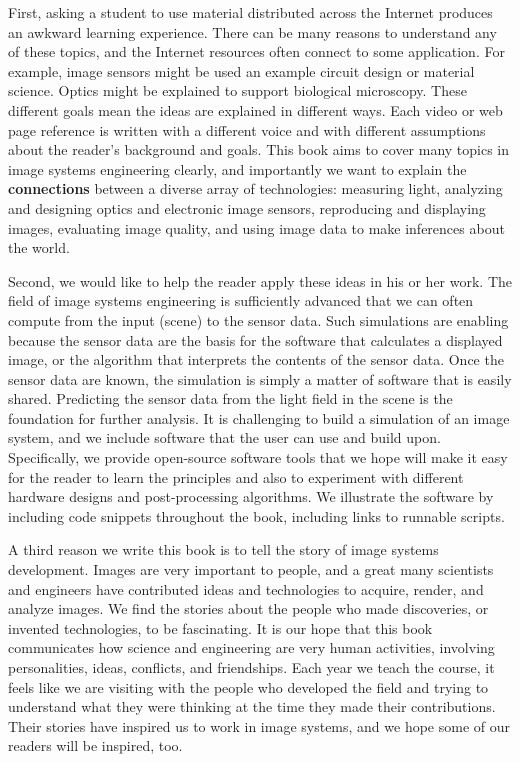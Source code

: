 \documentclass[
  letterpaper,
]{book}
\begin{document}
First, asking a student to use material distributed across the Internet
produces an awkward learning experience. There can be many reasons to
understand any of these topics, and the Internet resources often connect
to some application. For example, image sensors might be used an example
circuit design or material science. Optics might be explained to support
biological microscopy. These different goals mean the ideas are
explained in different ways. Each video or web page reference is written
with a different voice and with different assumptions about the reader's
background and goals. This book aims to cover many topics in image
systems engineering clearly, and importantly we want to explain the
\textbf{connections} between a diverse array of technologies: measuring
light, analyzing and designing optics and electronic image sensors,
reproducing and displaying images, evaluating image quality, and using
image data to make inferences about the world.

Second, we would like to help the reader apply these ideas in his or her
work. The field of image systems engineering is sufficiently advanced
that we can often compute from the input (scene) to the sensor data.
Such simulations are enabling because the sensor data are the basis for
the software that calculates a displayed image, or the algorithm that
interprets the contents of the sensor data. Once the sensor data are
known, the simulation is simply a matter of software that is easily
shared. Predicting the sensor data from the light field in the scene is
the foundation for further analysis. It is challenging to build a
simulation of an image system, and we include software that the user can
use and build upon. Specifically, we provide open-source software tools
that we hope will make it easy for the reader to learn the principles
and also to experiment with different hardware designs and
post-processing algorithms. We illustrate the software by including code
snippets throughout the book, including links to runnable scripts.

A third reason we write this book is to tell the story of image systems
development. Images are very important to people, and a great many
scientists and engineers have contributed ideas and technologies to
acquire, render, and analyze images. We find the stories about the
people who made discoveries, or invented technologies, to be
fascinating. It is our hope that this book communicates how science and
engineering are very human activities, involving personalities, ideas,
conflicts, and friendships. Each year we teach the course, it feels like
we are visiting with the people who developed the field and trying to
understand what they were thinking at the time they made their
contributions. Their stories have inspired us to work in image systems,
and we hope some of our readers will be inspired, too.
\end{document}
